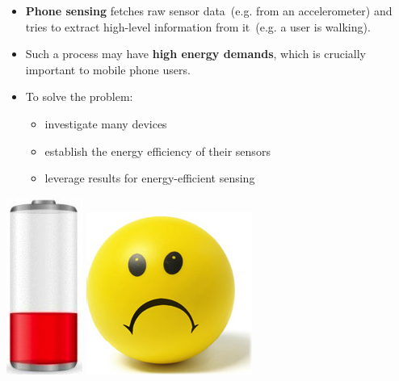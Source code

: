 \documentclass[a2,landscape]{a0poster}
\begin{document}
\begin{itemize}
   \item \textbf{Phone sensing} fetches raw sensor data\ (e.g. from an accelerometer) and tries to extract high-level information from it\ (e.g. a user is walking).
   \item Such a process may have \textbf{high energy demands}, which is crucially important to mobile phone users.
   \item To solve the problem:
	   \begin{itemize}
   			\item investigate many devices 
   			\item establish the energy efficiency of their sensors
   			\item leverage results for energy-efficient sensing
	   \end{itemize}
  \end{itemize}
  
\begin{center}
\includegraphics[scale=0.7]{plots/low_battery}
\includegraphics[scale=0.7]{plots/sad_face}
\end{center}
\end{document}
